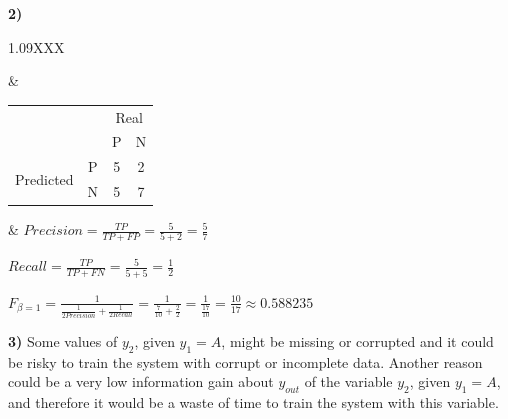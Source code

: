 \documentclass[11pt,a4paper]{article}
\begin{document}
\begin{flushleft}
\textbf{2)}
\small
\hspace{-8.25mm}
\vspace{4mm}
\begin{tabularx}{1.09\textwidth}{XXX}
  
  \begin{tikzpicture}[node/.style={draw,rectangle}, ->]
    \node [node] (node_1) {$y_1$};
    \path (node_1) ++ (-135:2) node [node] (node_2) {P (5/7)};
    \path (node_1) ++ (-45:2) node [node] (node_3) {N (7/13)};
    \draw (node_1) -- (node_2) node [left,pos=0.25] {A\hspace{2mm} }(node_1);
    \draw (node_1) -- (node_3) node [right,pos=0.25] {\hspace{2mm}B}(node_1);
  \end{tikzpicture} &

  \begin{tabular}{llcc}
    &                        & \multicolumn{2}{c}{Real}                        \\ \cline{3-4} 
    & \multicolumn{1}{l|}{}  & \multicolumn{1}{c|}{P} & \multicolumn{1}{c|}{N} \\ \cline{2-4} 
  \multicolumn{1}{c|}{\multirow{2}{*}{Predicted}} & \multicolumn{1}{c|}{P} & \multicolumn{1}{c|}{5} & \multicolumn{1}{c|}{2} \\ \cline{2-4} 
  \multicolumn{1}{c|}{}                           & \multicolumn{1}{c|}{N} & \multicolumn{1}{c|}{5} & \multicolumn{1}{c|}{7} \\ \cline{2-4} 
  \end{tabular} &
  \normalsize
  $ Precision = \frac{TP}{TP + FP} = \frac{5}{5 + 2} = \frac{5}{7} $ \par
  $ Recall = \frac{TP}{TP + FN} = \frac{5}{5 + 5} = \frac{1}{2} $
\end{tabularx}
\vspace{0mm}
\normalsize
$ F_{\beta = 1} = \frac{1}{\frac{1}{2Precision} + \frac{1}{2Recall}} = \frac{1}{\frac{7}{10} + \frac{2}{2}} = \frac{1}{\frac{17}{10}} = \frac{10}{17} \approx 0.588235 $ \par
\end{flushleft}
\vspace*{2mm}

\begin{flushleft}
\textbf{3)}
Some values of $y_2$, given $y_1 = A$, might be missing or corrupted and it could be risky to train the system with corrupt or incomplete data. Another reason could be a very low information gain about $y_{out}$ of the variable $y_2$, given $y_1 = A$, and therefore it would be a waste of time to train the system with this variable. \par
\end{flushleft}
\vspace*{2mm}
\end{document}
